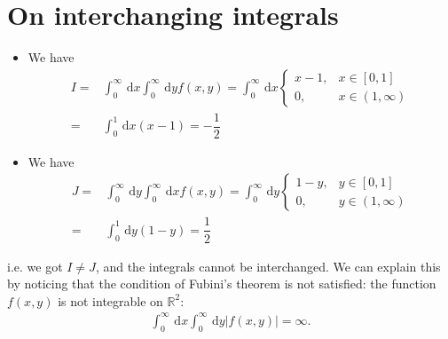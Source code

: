 \documentclass[11pt,a4paper]{article}
\numberwithin{equation}{section}%
\begin{document}
\section{On interchanging integrals}

\begin{itemize}[topsep=2pt,itemsep=0pt]
    \item We have
    \begin{align*}
        I =& \int_0^\infty \,\mathrm{d}x\int_0^\infty \,\mathrm{d}y f(x,y) = \int_0^\infty \,\mathrm{d}x \begin{cases}
            x-1, & x\in [0,1]\\
            0, & x\in (1,\infty)
        \end{cases}\\
        =& \int_0^1 \,\mathrm{d}x (x-1) = -\dfrac{1}{2}
    \end{align*}

    \item We have
    \begin{align*}
        J=& \int_0^\infty \,\mathrm{d}y\int_0^\infty \,\mathrm{d}x f(x,y) = \int_0^\infty \,\mathrm{d}y \begin{cases}
            1-y, & y\in [0,1]\\
            0, & y\in (1,\infty) 
        \end{cases}\\
        =& \int_0^1 \,\mathrm{d}y (1-y) = \dfrac{1}{2}
    \end{align*}
\end{itemize}

i.e. we got $ I\neq J $, and the integrals cannot be interchanged. We can explain this by noticing that the condition of Fubini's theorem is not satisfied: the function $ f(x,y) $ is not integrable on $ \mathbb{R}^2 $:
\begin{align*}
    \int_0^\infty \,\mathrm{d}x\int_0^\infty \,\mathrm{d}y \left\vert f(x,y) \right\vert =\infty.
\end{align*}



    


    
\end{document}
